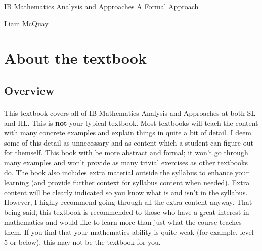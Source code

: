 \documentclass[12pt, a4paper, titlepage, twoside]{article}
\begin{document}
	\begin{titlepage}
  	\null\vfill

  	\begin{center}
  		{\Huge IB Mathematics Analysis and Approaches} \vskip 2cm
  		{\Large A Formal Approach} \vskip 1cm
 	\end{center}

	\vfill
	\vfill
	
	\begin{center}
  		{\Large Liam McQuay}
 	\end{center}

	\end{titlepage}

	\newpage
	
	\tableofcontents
	
	\newpage
	
\section{About the textbook}

	\subsection*{Overview}

	\paragraph{}
	This textbook covers all of IB Mathematics Analysis and Approaches at both SL and HL. This 
	is \textbf{not} your typical textbook. Most textbooks will teach the content with many concrete examples and explain
	things in quite a bit of detail. I deem some of this detail as unnecessary and as content which a student can figure out
	for themself. This book with be more abstract and formal; it won't go through many examples and won't provide as many
	trivial exercises as other textbooks do. 
	The book also includes extra material outside the syllabus to enhance your learning (and provide further context for 	
	syllabus content when needed). Extra content will be clearly indicated so you know what is and isn't in the syllabus. However, I highly 
	recommend going through all the extra content anyway. That being said, this textbook is recommended to those who have a great
	interest in mathematics and would like to learn more than just what the course teaches them. If you find that your mathematics 
	ability is quite weak (for example, level 5 or below), this may not be the textbook for you.
\end{document}
